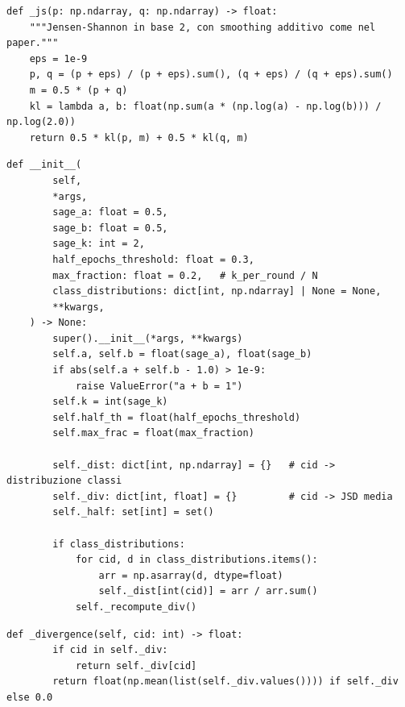 \documentclass[11pt,a4paper]{article}
\begin{document}
\begin{lstlisting}[style=py,firstnumber=13,caption={\texttt{tesifl/strategies/sage.py}, lines 13--19}]
def _js(p: np.ndarray, q: np.ndarray) -> float:
    """Jensen-Shannon in base 2, con smoothing additivo come nel paper."""
    eps = 1e-9
    p, q = (p + eps) / (p + eps).sum(), (q + eps) / (q + eps).sum()
    m = 0.5 * (p + q)
    kl = lambda a, b: float(np.sum(a * (np.log(a) - np.log(b))) / np.log(2.0))
    return 0.5 * kl(p, m) + 0.5 * kl(q, m)
\end{lstlisting}

\begin{lstlisting}[style=py,firstnumber=40,caption={\texttt{tesifl/strategies/sage\_ablation.py}, lines 40--67}]
    def __init__(
        self,
        *args,
        sage_a: float = 0.5,
        sage_b: float = 0.5,
        sage_k: int = 2,
        half_epochs_threshold: float = 0.3,
        max_fraction: float = 0.2,   # k_per_round / N
        class_distributions: dict[int, np.ndarray] | None = None,
        **kwargs,
    ) -> None:
        super().__init__(*args, **kwargs)
        self.a, self.b = float(sage_a), float(sage_b)
        if abs(self.a + self.b - 1.0) > 1e-9:
            raise ValueError("a + b = 1")
        self.k = int(sage_k)
        self.half_th = float(half_epochs_threshold)
        self.max_frac = float(max_fraction)

        self._dist: dict[int, np.ndarray] = {}   # cid -> distribuzione classi
        self._div: dict[int, float] = {}         # cid -> JSD media
        self._half: set[int] = set()

        if class_distributions:
            for cid, d in class_distributions.items():
                arr = np.asarray(d, dtype=float)
                self._dist[int(cid)] = arr / arr.sum()
            self._recompute_div()
\end{lstlisting}

\begin{lstlisting}[style=py,firstnumber=74,caption={\texttt{tesifl/strategies/sage\_ablation.py}, lines 74--77}]
    def _divergence(self, cid: int) -> float:
        if cid in self._div:
            return self._div[cid]
        return float(np.mean(list(self._div.values()))) if self._div else 0.0
\end{lstlisting}
\end{document}
